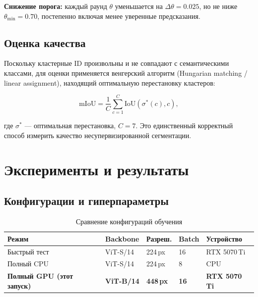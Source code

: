 \documentclass[11pt,a4paper]{article}
\begin{document}
\noindent \textbf{Снижение порога:} каждый раунд $\theta$ уменьшается на $\Delta\theta = 0.025$,
но не ниже $\theta_\text{min} = 0.70$, постепенно включая менее уверенные предсказания.

\subsection{Оценка качества}

Поскольку кластерные ID произвольны и не совпадают с семантическими классами,
для оценки применяется венгерский алгоритм (Hungarian matching / linear assignment),
находящий оптимальную перестановку кластеров:

\begin{equation}
  \text{mIoU} = \frac{1}{C} \sum_{c=1}^{C} \text{IoU}\!\left(\sigma^*(c), c\right),
  \label{eq:miou}
\end{equation}

\noindent где $\sigma^*$ --- оптимальная перестановка, $C = 7$. Это единственный
корректный способ измерить качество несупервизированной сегментации.

\section{Эксперименты и результаты}

\subsection{Конфигурации и гиперпараметры}

\begin{table}[htbp]
\centering
\caption{Сравнение конфигураций обучения}
\label{tab:configs}
\small
\begin{tabularx}{0.92\textwidth}{L{2.8cm} C{2cm} C{1.5cm} C{1.8cm} C{2.5cm}}
  \toprule
  \textbf{Режим} & \textbf{Backbone} & \textbf{Разреш.} & \textbf{Batch} & \textbf{Устройство} \\
  \midrule
  Быстрый тест                      & ViT-S/14          & 224\,px          & 16        & RTX 5070\,Ti \\
  Полный CPU                        & ViT-S/14          & 224\,px          &  8        & CPU \\
  \textbf{Полный GPU (этот запуск)} & \textbf{ViT-B/14} & \textbf{448\,px} & \textbf{16} & \textbf{RTX 5070\,Ti} \\
  \bottomrule
\end{tabularx}
\end{table}
\end{document}
